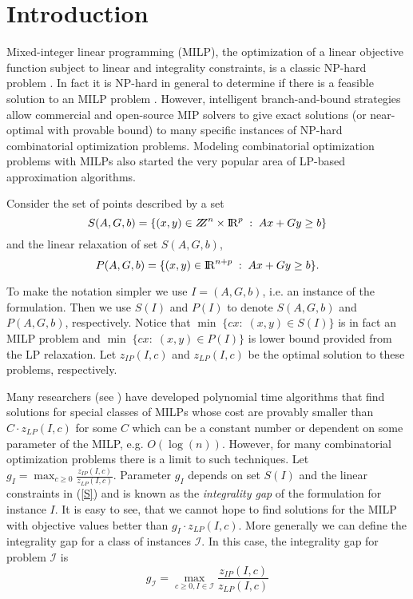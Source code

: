 \section{Introduction}
Mixed-integer linear programming (MILP), the optimization of a linear objective function subject to linear and integrality constraints, is a classic NP-hard problem \cite{GJ79}. In fact it is NP-hard in general to determine if there is a feasible solution to an MILP problem \cite{GJ79}. However, intelligent branch-and-bound strategies allow commercial and open-source MIP solvers to give exact solutions (or near-optimal with provable bound) to many specific instances of NP-hard combinatorial optimization problems. Modeling combinatorial optimization problems with MILPs also started the very popular area of LP-based approximation algorithms. 

Consider the set of points described by a set 
\begin{equation}
S(A,G,b)= \{(x,y)\in \bbbz^{n}\times \bbbr^p\;:\; Ax+Gy\geq b\}  \label{S}
\end{equation}
and the  linear relaxation of set $S(A,G,b)$,
\begin{equation}
P(A,G,b) = \{(x,y)\in {\rm I\!R}^{n+ p}\;:\; Ax+Gy\geq b\}. \label{P}
\end{equation}

To make the notation simpler we use $I=(A,G,b)$, i.e. an instance of the formulation. Then we use $S(I)$ and $P(I)$ to denote $S(A,G,b)$ and $P(A,G,b)$, respectively. Notice that $\min \;\{cx:\; (x,y) \in S(I)\}$ is in fact an MILP problem and $\min \;\{cx:\;(x,y)\in P(I) \}$ is lower bound provided from the LP relaxation. Let $z_{IP}(I,c)$ and $z_{LP}(I,c)$ be the optimal solution to these problems, respectively.


Many researchers (see \cite{vazirani,sw}) have developed polynomial time algorithms that find solutions for special classes of MILPs whose cost are provably smaller than $C\cdot z_{LP}(I,c)$ for some $C$ which can be a constant number or dependent on some parameter of the MILP, e.g. $O(\log(n))$. However, for many combinatorial optimization problems there is a limit to such techniques. Let $g_I= \max_{c\geq 0}\frac{z_{IP}(I,c)}{z_{LP}(I,c)}$. Parameter $g_I$ depends on set $S(I)$ and the linear constraints in (\ref{S}) and is known as the \textit{integrality gap} of the formulation for instance $I$. It is easy to see, that we cannot hope to find solutions for the MILP with objective values better than $g_I\cdot z_{LP}(I,c)$. More generally we can define the integrality gap for a class of instances $\mathcal{I}$. In this case, the integrality gap for problem $\mathcal{I}$ is
\begin{equation}
g_\mathcal{I} = \max_{c\geq 0 , I\in\mathcal{I}}\frac{z_{IP}(I,c)}{z_{LP}(I,c)}
\end{equation}


